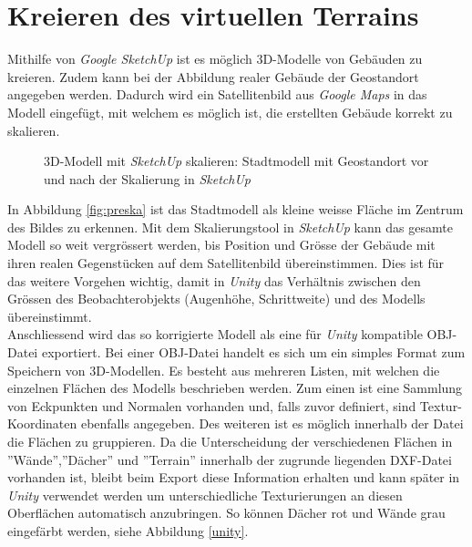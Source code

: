 \section{Kreieren des virtuellen Terrains}\label{s.terrain}
Mithilfe von \textit{Google SketchUp} ist es möglich 3D-Modelle von Gebäuden zu kreieren. Zudem kann bei der Abbildung realer Gebäude der Geostandort angegeben werden. Dadurch wird ein Satellitenbild aus \textit{Google Maps} in das Modell eingefügt, mit welchem es möglich ist, die erstellten Gebäude korrekt zu skalieren.

\begin{figure}[htp]%
	\centering	
	\hspace{48pt}%
	\hspace{8pt}%

	\caption[3D-Modell mit \textit{SketchUp} skalieren]
	{3D-Modell mit \textit{SketchUp} skalieren:
		 Stadtmodell mit Geostandort vor und
		 nach der Skalierung in \textit{SketchUp}}%
	\label{fig:sketchup} %
\end{figure}

In Abbildung \ref{fig:preska} ist das Stadtmodell als kleine weisse Fläche im Zentrum des Bildes zu erkennen.  Mit dem Skalierungstool in \textit{SketchUp} kann das gesamte Modell so weit vergrössert werden, bis Position und Grösse der Gebäude mit ihren realen Gegenstücken auf dem Satellitenbild übereinstimmen. Dies ist für das weitere Vorgehen wichtig, damit in \textit{Unity} das Verhältnis zwischen den Grössen des Beobachterobjekts (Augenhöhe, Schrittweite) und des Modells übereinstimmt.\\[6pt]
Anschliessend wird das so korrigierte Modell als eine für \textit{Unity} kompatible OBJ-Datei exportiert. Bei einer OBJ-Datei handelt es sich um ein simples Format zum Speichern von 3D-Modellen. Es besteht aus mehreren Listen, mit welchen die einzelnen Flächen des Modells beschrieben werden. Zum einen ist eine Sammlung von Eckpunkten und Normalen vorhanden und, falls zuvor definiert, sind Textur-Koordinaten ebenfalls angegeben. Des weiteren ist es möglich innerhalb der Datei die Flächen zu gruppieren. Da die Unterscheidung der verschiedenen Flächen in ''Wände'',''Dächer'' und ''Terrain'' innerhalb der zugrunde liegenden DXF-Datei vorhanden ist, bleibt beim Export diese Information erhalten und kann später in \textit{Unity} verwendet werden um unterschiedliche Texturierungen an diesen Oberflächen automatisch anzubringen. So können Dächer rot und Wände grau eingefärbt werden, siehe Abbildung \ref{unity}.\\[6pt]

